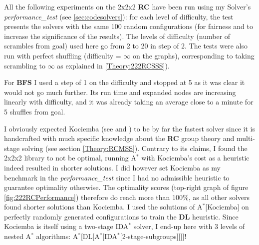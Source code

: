 All the following experiments on the 2x2x2 \textbf{RC} have been run using my Solver's \textit{performance\_test} (see \ref{sec:codesolvers}): for each level of difficulty, the test presents the solvers with the same 100 random configurations (for fairness and to increase the significance of the results). The levels of difficulty (number of scrambles from goal) used here go from 2 to 20 in step of 2. The tests were also run with perfect shuffling (difficulty = $\infty$ on the graphs), corresponding to taking scrambling to $\infty$ as explained in \ref{Theory:222RCSSS}).

For \textbf{BFS} I used a step of 1 on the difficulty and stopped at 5 as it was clear it would not go much further. Its run time and expanded nodes are increasing linearly with difficulty, and it was already taking an average close to a minute for 5 shuffles from goal.

I obviously expected Kociemba (see \cite{HKociemba} and \cite{Kociemba}) to be by far the fastest solver since it is handcrafted with much specific knowledge about the \textbf{RC} group theory and multi-stage solving (see section \ref{Theory:RCMSS}). Contrary to its claims, I found the 2x2x2 library to not be optimal, running A$^{*}$ with Kociemba's cost as a heuristic indeed resulted in shorter solutions. I did however set Kociemba as my benchmark in the \textit{performance\_test} since I had no admissible heuristic to guarantee optimality otherwise. The optimality scores (top-right graph of figure \ref{fig:222RCPerformance}) therefore do reach more than 100\%, as all other solvers found shorter solutions than Kociemba. I used the solutions of A$^{*}$[Kociemba] on perfectly randomly generated configurations to train the \textbf{DL} heuristic. Since Kociemba is itself using a two-stage IDA$^{*}$ solver, I end-up here with 3 levels of nested A$^{*}$ algorithms: A$^{*}$[DL[A$^{*}$[IDA$^{*}$[2-stage-subgroups]]]]!






